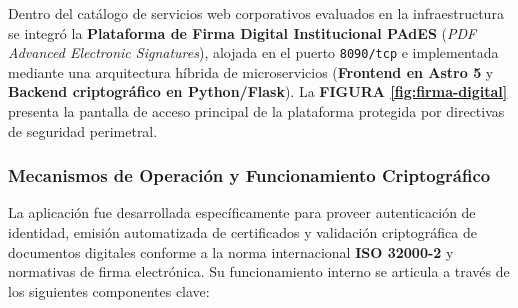 Dentro del catálogo de servicios web corporativos evaluados en la infraestructura se integró la \textbf{Plataforma de Firma Digital Institucional PAdES} (\textit{PDF Advanced Electronic Signatures}), alojada en el puerto \texttt{8090/tcp} e implementada mediante una arquitectura híbrida de microservicios (\textbf{Frontend en Astro 5} y \textbf{Backend criptográfico en Python/Flask}). La \textbf{FIGURA \ref{fig:firma-digital}} presenta la pantalla de acceso principal de la plataforma protegida por directivas de seguridad perimetral.


\subsubsection{Mecanismos de Operación y Funcionamiento Criptográfico}

La aplicación fue desarrollada específicamente para proveer autenticación de identidad, emisión automatizada de certificados y validación criptográfica de documentos digitales conforme a la norma internacional \textbf{ISO 32000-2} y normativas de firma electrónica. Su funcionamiento interno se articula a través de los siguientes componentes clave:

